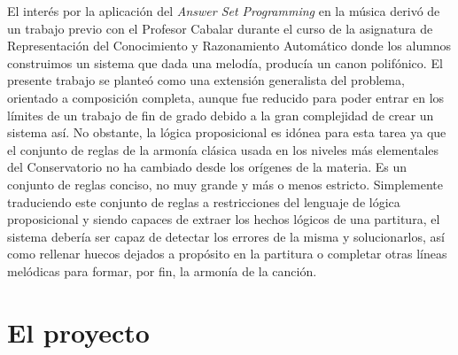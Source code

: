 El interés por la aplicación del \textit{Answer Set Programming} en la música derivó de un trabajo previo con el Profesor Cabalar durante el curso de la asignatura de Representación del Conocimiento y Razonamiento Automático donde los alumnos construimos un sistema que dada una melodía, producía un canon polifónico. El presente trabajo se planteó como una extensión generalista del problema, orientado a composición completa, aunque fue reducido para poder entrar en los límites de un trabajo de fin de grado debido a la gran complejidad de crear un sistema así. No obstante, la lógica proposicional es idónea para esta tarea ya que el conjunto de reglas de la armonía clásica usada en los niveles más elementales del Conservatorio no ha cambiado desde los orígenes de la materia. Es un conjunto de reglas conciso, no muy grande y más o menos estricto. Simplemente traduciendo este conjunto de reglas a restricciones del lenguaje de lógica proposicional y siendo capaces de extraer los hechos lógicos de una partitura, el sistema debería ser capaz de detectar los errores de la misma y solucionarlos, así como rellenar huecos dejados a propósito en la partitura o completar otras líneas melódicas para formar, por fin, la armonía de la canción.

\section{El proyecto}

